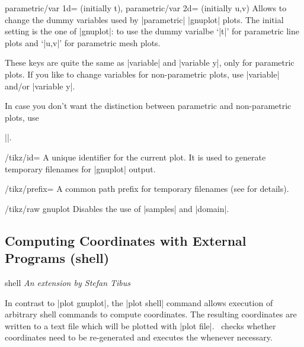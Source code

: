 {\begin{pgfplotskeylist}{%
	parametric/var 1d= (initially t),%
	parametric/var 2d= (initially {u,v})%
	}
	Allows to change the dummy variables used by |parametric| |gnuplot| plots. The initial setting is the one of |gnuplot|: to use the dummy varialbe `|t|' for parametric line plots and `|u,v|' for parametric mesh plots. 

	These keys are quite the same as |variable| and |variable y|, only for parametric plots. If you like to change variables for non-parametric plots, use |variable| and/or |variable y|.

	In case you don't want the distinction between parametric and non-parametric plots, use 
	
	|\pgfplotsset{parametric/var 1d=,parametric/var 2d=}|.

\end{pgfplotskeylist}

\begin{key}{/tikz/id=}
	 A unique identifier for the current plot. It is used to generate temporary filenames for |gnuplot| output.
\end{key}

\begin{key}{/tikz/prefix=}
	 A common path prefix for temporary filenames (see \cite[section~18.6]{tikz} for details).
\end{key}

\begin{key}{/tikz/raw gnuplot}
	 Disables the use of |samples| and |domain|.
\end{key}

\subsection{Computing Coordinates with External Programs (shell)}

\begin{addplotoperation}[]{shell}{}
{\small \emph{An extension by Stefan Tibus}}

In contrast to |plot gnuplot|, the |plot shell| command allows execution of arbitrary shell commands to compute coordinates. The resulting coordinates are written to a text file which will be plotted with |plot file|. \PGF\ checks whether coordinates need to be re-generated and executes the  whenever necessary.


\end{addplotoperation}}
